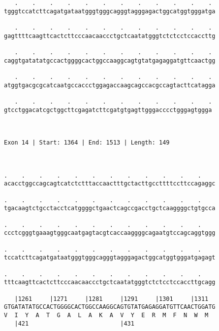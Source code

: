 \documentclass{article}
\begin{document}
\begin{Verbatim}
   .    .    .    .    .    .    .    .    .    .    .    . 
tgggtccatcttcagatgataatgggtgggcagggtagggagactggcatggtgggatga
                                                            
   .    .    .    .    .    .    .    .    .    .    .    . 
gagttttcaagttcactcttcccaacaaccctgctcaatatgggtctctcctccaccttg
                                                            
   .    .    .    .    .    .    .    .    .    .    .    . 
caggtgatatatgccactggggcactggccaaggcagtgtatgagaggatgttcaactgg
                                                            
   .    .    .    .    .    .    .    .    .    .    .    . 
atggtgacgcgcatcaatgccaccctggagaccaagcagccacgccagtacttcatagga
                                                            
   .    .    .    .    .    .    .    .    .    .    .    .
gtcctggacatcgctggcttcgagatcttcgatgtgagttgggacccctgggagtggga
                                                           
                                                           
 
Exon 14 | Start: 1364 | End: 1513 | Length: 149



.    .    .    .    .    .    .    .    .    .    .    .    
acacctggccagcagtcatctctttaccaactttgctacttgccttttccttccagaggc
                                                            
.    .    .    .    .    .    .    .    .    .    .    .    
tgacaagtctgcctacctcatggggctgaactcagccgacctgctcaaggggctgtgcca
                                                            
.    .    .    .    .    .    .    .    .    .    .    .    
ccctcgggtgaaagtgggcaatgagtacgtcaccaaggggcagaatgtccagcaggtggg
                                                            
.    .    .    .    .    .    .    .    .    .    .    .    
tccatcttcagatgataatgggtgggcagggtagggagactggcatggtgggatgagagt
                                                            
.    .    .    .    .    .    .    .    .    .    .    .    
tttcaagttcactcttcccaacaaccctgctcaatatgggtctctcctccaccttgcagg
                                                            
   |1261     |1271     |1281     |1291     |1301     |1311  
GTGATATATGCCACTGGGGCACTGGCCAAGGCAGTGTATGAGAGGATGTTCAACTGGATG
V  I  Y  A  T  G  A  L  A  K  A  V  Y  E  R  M  F  N  W  M  
   |421                          |431                       
  

\end{Verbatim}
\end{document}
